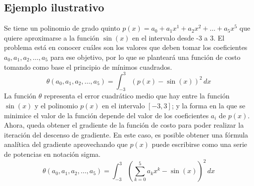 \documentclass[conference]{IEEEtran}
\begin{document}
\subsection{Ejemplo ilustrativo}\label{sec1:5}
Se tiene un polinomio de grado quinto \(p(x)=a_{0}+a_{1}x^{1}+a_{2}x^{2}+\dots +a_{5}x^{5}\) que quiere aproximarse a la función \(\sin(x)\) en el intervalo desde -3 a 3. El problema está en conocer cuáles son los valores que deben tomar los coeficientes \(a_{0},a_{1},a_{2},\dots,a_{5}\) para ese objetivo, por lo que se planteará una función de costo tomando como base el principio de mínimos cuadrados.
\begin{equation}
\theta(a_{0},a_{1},a_{2},\dots,a_{5})=\int_{-3}^{3} (p(x)-\sin(x))^{2}\, dx \label{eq:cost-function}
\end{equation}
La función $\theta$ representa el error cuadrático medio que hay entre la función \(\sin(x)\) y el polinomio \(p(x)\) en el intervalo $[-3,3]$; y la forma en la que se minimice el valor de la función depende del valor de los coeficientes $a_i$ de $p(x)$. Ahora, queda obtener el gradiente de la función de costo para poder realizar la iteración del descenso de gradiente.
En este caso, es posible obtener una fórmula analítica del gradiente aprovechando que $p(x)$ puede escribirse como una serie de potencias en notación sigma.
\begin{equation}
\theta(a_{0},a_{1},a_{2},\dots,a_{5})=\int_{-3}^{3}\left( \sum^{ 5 }_{ k = 0 }a_{k}x^{k} -\sin(x) \right)^{2}\, dx \label{eq:power-series-cost-function}
\end{equation}
\end{document}
